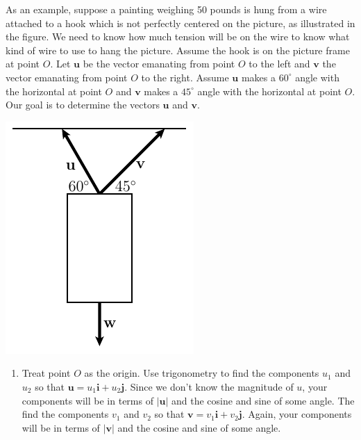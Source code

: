 \documentclass[10pt]{article}
\newcommand{\vu}{\mathbf{u}}
\newcommand{\vv}{\mathbf{v}}
\newcommand{\vi}{\mathbf{i}}
\newcommand{\vj}{\mathbf{j}}
\begin{document}
\begin{enumerate}[leftmargin=0pt]
\begin{minipage}[t]{0.5\linewidth}
    As an example, suppose a painting weighing 50 pounds is hung from a wire attached to a hook which is not perfectly centered on the picture, as illustrated in the figure. We need to know how much tension will be on the wire to know what kind of wire to use to hang the picture. Assume the hook is on the picture frame at point $O$. Let $\vu$ be the vector emanating from point $O$ to the left and $\vv$ the vector emanating from point $O$ to the right. Assume $\vu$ makes a $60^\circ$ angle with the horizontal at point $O$ and $\vv$ makes a $45^\circ$ angle with the horizontal at point $O$. Our goal is to determine the vectors $\vu$ and $\vv$.
    \end{minipage}
    \hfill
    \begin{minipage}[t]{0.4\linewidth}
    \vspace{0pt}
    \includegraphics[width=\linewidth]{./fig_9_2_forces.pdf}
    \end{minipage}
    \begin{enumerate}
        \item Treat point $O$ as the origin. Use trigonometry to find the components $u_1$ and $u_2$ so that $\vu = u_1 \vi + u_2 \vj$. Since we don't know the magnitude of $u$, your components will be in terms of $|\vu|$ and the cosine and sine of some angle. The find the components $v_1$ and $v_2$ so that $\vv =v_1 \vi + v_2 \vj$. Again, your components will be in terms of $|\vv|$ and the cosine and sine of some angle.
        

\end{enumerate}
\end{enumerate}
\end{document}
